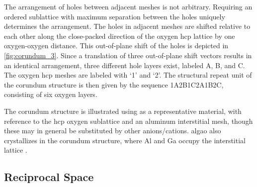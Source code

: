 The arrangement of holes between adjacent meshes is not arbitrary. Requiring an
ordered sublattice with maximum separation between the holes uniquely determines
the arrangement. The holes in adjacent meshes are shifted relative to each other along
the close-packed direction of the oxygen hcp lattice by one oxygen-oxygen distance.
This out-of-plane shift of the holes is depicted in \cref{fig:corundum_3}. Since a
translation of three out-of-plane shift vectors results in an identical arrangement,
three different hole layers exist, labeled A, B, and C. The oxygen hcp meshes
are labeled with `1' and `2'. The structural repeat unit of the corundum structure
is then given by the sequence 1A2B1C2A1B2C, consisting of six oxygen layers.

The corundum structure is illustrated using  as a representative material,
with reference to the hcp oxygen sublattice and an aluminum interstitial mesh, though
these may in general be substituted by other anions/cations. \ac{algao} also crystallizes
in the corundum structure, where Al and Ga occupy the interstitial lattice
\autocite{peelaers_structural_2018}.

\subsection{Reciprocal Space}
\label{sec:reciprocal_space}

